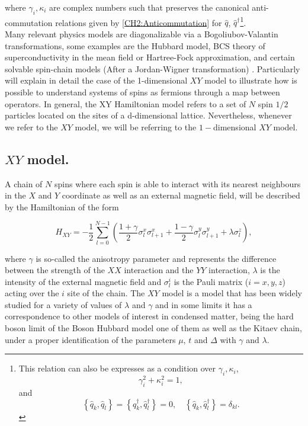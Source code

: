 where $\gamma_i , \kappa_i$ are complex numbers such that preserves the canonical anti-commutation relations given by \eqref{CH2:Anticommutation} for $\hat{q}$, $\hat{q}^{\dagger}$\footnote{This relation can also be expresses as a condition over $\gamma_i , \kappa_i$,
\[ \gamma_i ^2+ \kappa_i^2 = 1,\]
and 
\[\left\{\hat{q}_{k}, \hat{q}_{l}\right\}=\left\{\hat{q}_{k}^{\dagger}, \hat{q}_{l}^{\dagger}\right\}=0, \quad\left\{\hat{q}_{k}, \hat{q}_{l}^{\dagger}\right\}=\delta_{k l}.\]
 }.\\

\indent Many relevant physics models are diagonalizable via a Bogoliubov-Valantin transformations, some examples are the Hubbard model, BCS theory of superconductivity in the mean field or Hartree-Fock approximation, and certain solvable spin-chain models (After a Jordan-Wigner transformation) \cite{katsura_statistical_1962, barouch_statistical_1971, barouch_statistical_1970,fradkin_field_1997}. Particularly will explain in detail the case of the 1-dimensional $XY$ model to illustrate how is possible to understand systems of spins as fermions through a map between operators. In general, the XY Hamiltonian model refers to a set of $N$ spin $1/2$ particles located on the sites of a d-dimensional lattice. Nevertheless, whenever we refer to the $XY$ model, we will be referring to the $1-$dimensional $XY$ model.\\
\subsection{$XY$ model. }
A chain of $N$ spins where each spin is able to interact with its nearest neighbours in the $X$ and $Y$ coordinate as well as an external magnetic field, will be described by the Hamiltonian of the form

\begin{equation}
H_{X Y}=-\frac{1}{2} \sum_{l=0}^{N-1}\left(\frac{1+\gamma}{2} \sigma_{l}^{x} \sigma_{l+1}^{x}+\frac{1-\gamma}{2} \sigma_{l}^{y} \sigma_{l+1}^{y}+\lambda \sigma_{l}^{z}\right),
\label{CH3:Hamiltonian_XY}
\end{equation}

where $\gamma$ is so-called the anisotropy parameter and represents the difference between the strength of the $XX$ interaction and the $YY$ interaction, $\lambda$ is the intensity of the external magnetic field and $\sigma^{i}_{l}$ is the Pauli matrix ($i= x,y,z$) acting over the $i$ site of the chain. The $XY$ model is a model that has been widely studied for a variety of values of $\lambda$ and $\gamma$ and in some limits it has a correspondence to other models of interest in condensed matter\cite{katsura_statistical_1962, barouch_statistical_1971, barouch_statistical_1970}, being the hard boson limit of the Boson Hubbard model one of them as well as the Kitaev chain, under a proper identification of the parameters $\mu$, $t$ and $\Delta$ with $\gamma$ and $\lambda$\cite{katsura_statistical_1962,barouch_statistical_1971}.\\

